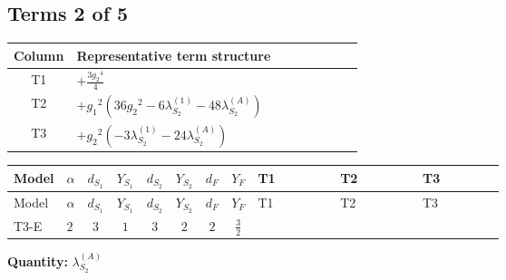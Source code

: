 \documentclass[8pt]{article}
\begin{document}
\begin{landscape}
\subsection*{Terms 2 of 5}
\begin{center}
\begin{tabular}{@{}c >{\raggedright\arraybackslash}p{0.82\linewidth}@{}}
\toprule
Column & Representative term structure \\
\midrule
T1 & \(\displaystyle +\frac{3 {g_2}^4}{4}\) \\
\midrule
T2 & \(\displaystyle +{g_1}^2 \left(36 {g_2}^2-6 {\lambda_{S_2}^{(1)}}-48 {\lambda_{S_2}^{(A)}}\right)\) \\
\midrule
T3 & \(\displaystyle +{g_2}^2 (-3 {\lambda_{S_2}^{(1)}}-24 {\lambda_{S_2}^{(A)}})\) \\
\midrule
\bottomrule
\end{tabular}
\end{center}
\smallskip
\tiny
\begin{longtable}{@{}llcccccc >{\raggedright\arraybackslash}p{0.21\linewidth} >{\raggedright\arraybackslash}p{0.21\linewidth} >{\raggedright\arraybackslash}p{0.21\linewidth}@{}}
\toprule
Model & $\alpha$ & $d_{S_1}$ & $Y_{S_1}$ & $d_{S_2}$ & $Y_{S_2}$ & $d_F$ & $Y_F$ & T1 & T2 & T3 \\
\midrule
\endfirsthead
\toprule
Model & $\alpha$ & $d_{S_1}$ & $Y_{S_1}$ & $d_{S_2}$ & $Y_{S_2}$ & $d_F$ & $Y_F$ & T1 & T2 & T3 \\
\midrule
\endhead
T3-E & $2$ & $3$ & $1$ & $3$ & $2$ & $2$ & $\frac{3}{2}$ & \scriptsize\adjustbox{max width=\linewidth}{$\begin{gathered} +\frac{3 {g_2}^4}{4}\end{gathered}$} & \scriptsize\adjustbox{max width=\linewidth}{$\begin{gathered} +{g_1}^2 \left(36 {g_2}^2-6 {\lambda_{S_2}^{(1)}}-48 {\lambda_{S_2}^{(A)}}\right)\end{gathered}$} & \scriptsize\adjustbox{max width=\linewidth}{$\begin{gathered} +{g_2}^2 (-3 {\lambda_{S_2}^{(1)}}-24 {\lambda_{S_2}^{(A)}})\end{gathered}$} \\
\midrule
\bottomrule
\end{longtable}
\clearpage
\noindent\textbf{Quantity: }$\lambda_{S_2}^{(A)}$\par\smallskip

\end{landscape}
\end{document}
